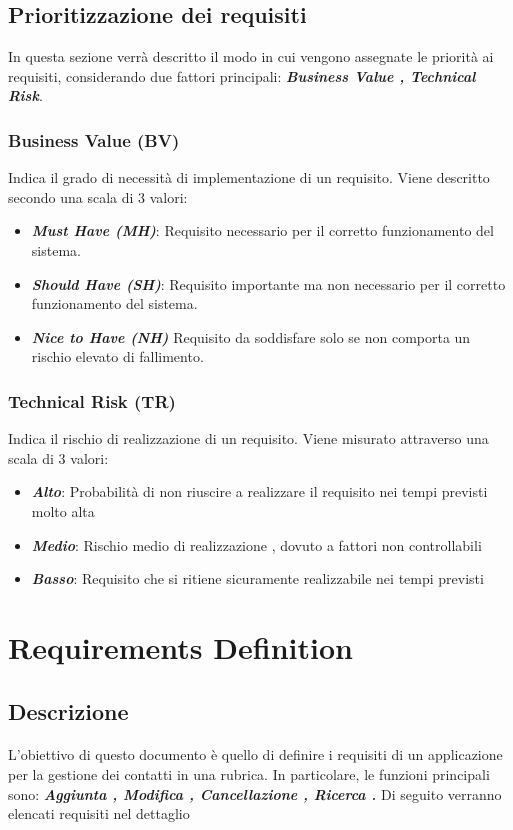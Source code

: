 \documentclass[a4paper,12pt]{article}
\begin{document}
    \subsection{Prioritizzazione dei requisiti}
    In questa sezione verrà descritto il modo in cui vengono assegnate le priorità ai requisiti, considerando due fattori principali: \textbf{\textit{Business Value , Technical Risk}}.
    \subsubsection{Business Value (BV)}
    Indica il grado di necessità di implementazione di un requisito. Viene descritto secondo una scala di 3 valori:
    \begin{itemize}
        \item \textbf{\textit{Must Have (MH)}}: Requisito necessario per il corretto funzionamento del sistema.
        \item  \textbf{\textit{Should Have (SH)}}: Requisito importante ma non necessario per il corretto funzionamento del sistema.
        \item \textbf{\textit{Nice to Have (NH)}} Requisito da soddisfare solo se non comporta un rischio elevato di fallimento.
    \end{itemize}
    \subsubsection{Technical Risk (TR)}
    Indica il rischio di realizzazione di un requisito. Viene misurato attraverso una scala di 3 valori:
    \begin{itemize}
        \item \textbf{\textit{Alto}}: Probabilità di non riuscire a realizzare il requisito nei tempi previsti molto alta
        \item \textbf{\textit{Medio}}: Rischio medio di realizzazione , dovuto a fattori non controllabili
        \item \textbf{\textit{Basso}}: Requisito che si ritiene sicuramente realizzabile nei tempi previsti
    \end{itemize}
    \section{Requirements Definition}
    \subsection{Descrizione}
    \paragraph{} L'obiettivo di questo documento è quello di definire i requisiti di un applicazione per la gestione dei contatti in una rubrica. In particolare, le funzioni principali sono: \textbf{\textit{Aggiunta , Modifica , Cancellazione , Ricerca .}} Di seguito verranno elencati requisiti nel dettaglio
\end{document}
